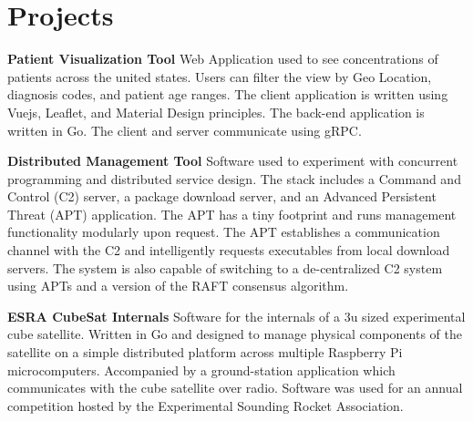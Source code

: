 \documentclass[letterpaper,12pt]{article}
\newcommand{\resumeItem}[1]{
  \item\small{
      {#1 \vspace{-2pt}}
  }
}
\newcommand{\resumeSubItem}[2]{\resumeItem{#1}{#2}\vspace{-4pt}}
\newcommand{\resumeSubHeadingListStart}{\begin{description}[leftmargin=*]}
\newcommand{\resumeSubHeadingListEnd}{\end{description}}
\begin{document}
\section{Projects}
\resumeSubHeadingListStart
    \resumeSubItem
    {\textbf{Patient Visualization Tool}}
    {Web Application used to see concentrations of patients across the united states. Users can filter the view by Geo Location, diagnosis codes, and patient age ranges. The client application is written using Vuejs, Leaflet, and Material Design principles. The back-end application is written in Go. The client and server communicate using gRPC.}
    \resumeSubItem
    {\textbf{Distributed Management Tool}}
    {Software used to experiment with concurrent programming and distributed service design. The stack includes a Command and Control (C2) server, a package download server, and an Advanced Persistent Threat (APT) application. The APT has a tiny footprint and runs management functionality modularly upon request. The APT establishes a communication channel with the C2 and intelligently requests executables from local download servers. The system is also capable of switching to a de-centralized C2 system using APTs and a version of the RAFT consensus algorithm.}
    \resumeSubItem
    {\textbf{ESRA CubeSat Internals}}
    {Software for the internals of a 3u sized experimental cube satellite. Written in Go and designed to manage physical components of the satellite on a simple distributed platform across multiple Raspberry Pi microcomputers. Accompanied by a ground-station application which communicates with the cube satellite over radio. Software was used for an annual competition hosted by the Experimental Sounding Rocket Association.}
\resumeSubHeadingListEnd


\end{document}
